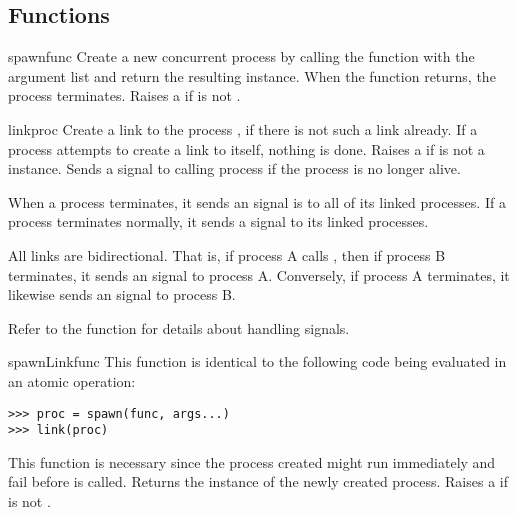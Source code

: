 \documentclass{howto}
\begin{document}
\subsection{Functions}

\begin{funcdesc}{spawn}{func}
Create a new concurrent process by calling the function  with the
 argument list and return the resulting  instance.
When the function  returns, the process terminates. Raises a
  if  is not
.
\end{funcdesc}

\begin{funcdesc}{link}{proc}
Create a link to the process , if there is not such a link already. If
a process attempts to create a link to itself, nothing is done. Raises a
  if  is not a 
instance. Sends a   signal to calling process if the
 process is no longer alive.

When a process terminates, it sends an  signal is to all of its
linked processes. If a process terminates normally, it sends a 
 signal to its linked processes.

All links are bidirectional. That is, if process A calls , then if
process B terminates, it sends an  signal to process A. Conversely,
if process A terminates, it likewise sends an  signal to process B.

Refer to the  function for details about handling
signals.
\end{funcdesc}

\begin{funcdesc}{spawnLink}{func}
This function is identical to the following code being evaluated in an atomic
operation:
\begin{verbatim}
>>> proc = spawn(func, args...)
>>> link(proc)
\end{verbatim}
This function is necessary since the process created might run immediately and
fail before  is called. Returns the  instance of
the newly created process. Raises a   if
 is not .
\end{funcdesc}
\end{document}
